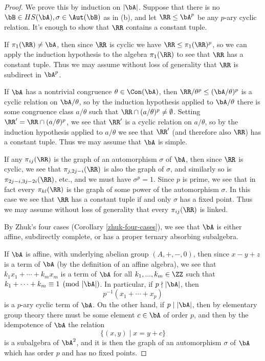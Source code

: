 \begin{proof} We prove this by induction on $|\bA|$. Suppose that there is no $\bB \in HS(\bA), \sigma \in \Aut(\bB)$ as in (b), and let $\RR \le \bA^p$ be any $p$-ary cyclic relation. It's enough to show that $\RR$ contains a constant tuple.

If $\pi_1(\RR) \ne \bA$, then since $\RR$ is cyclic we have $\RR \le \pi_1(\RR)^p$, so we can apply the induction hypothesis to the algebra $\pi_1(\RR)$ to see that $\RR$ has a constant tuple. Thus we may assume without loss of generality that $\RR$ is subdirect in $\bA^p$.

If $\bA$ has a nontrivial congruence $\theta \in \Con(\bA)$, then $\RR/\theta^p \le (\bA/\theta)^p$ is a cyclic relation on $\bA/\theta$, so by the induction hypothesis applied to $\bA/\theta$ there is some congruence class $a/\theta$ such that $\RR \cap (a/\theta)^p \ne \emptyset$. Setting $\RR' = \RR \cap (a/\theta)^p$, we see that $\RR'$ is a cyclic relation on $a/\theta$, so by the induction hypothesis applied to $a/\theta$ we see that $\RR'$ (and therefore also $\RR$) has a constant tuple. Thus we may assume that $\bA$ is simple.

If any $\pi_{ij}(\RR)$ is the graph of an automorphism $\sigma$ of $\bA$, then since $\RR$ is cyclic, we see that $\pi_{j,2j-i}(\RR)$ is also the graph of $\sigma$, and similarly so is $\pi_{2j-i,3j-2i}(\RR)$, etc., and we must have $\sigma^p = 1$. Since $p$ is prime, we see that in fact every $\pi_{kl}(\RR)$ is the graph of some power of the automorphism $\sigma$. In this case we see that $\RR$ has a constant tuple if and only $\sigma$ has a fixed point. Thus we may assume without loss of generality that every $\pi_{ij}(\RR)$ is linked.

By Zhuk's four cases (Corollary \ref{zhuk-four-cases}), we see that $\bA$ is either affine, subdirectly complete, or has a proper ternary absorbing subalgebra.

If $\bA$ is affine, with underlying abelian group $(A, +, -, 0)$, then since $x-y+z$ is a term of $\bA$ (by the definition of an affine algebra), we see that $k_1x_1 + \cdots + k_mx_m$ is a term of $\bA$ for all $k_1, ..., k_m \in \ZZ$ such that $k_1 + \cdots + k_m \equiv 1 \pmod{|\bA|}$. In particular, if $p \nmid |\bA|$, then
\[
p^{-1}(x_1 + \cdots + x_p)
\]
is a $p$-ary cyclic term of $\bA$. On the other hand, if $p \mid |\bA|$, then by elementary group theory there must be some element $c \in \bA$ of order $p$, and then by the idempotence of $\bA$ the relation
\[
\{(x,y) \mid x = y + c\}
\]
is a subalgebra of $\bA^2$, and it is then the graph of an automorphism $\sigma$ of $\bA$ which has order $p$ and has no fixed points.


\end{proof}
